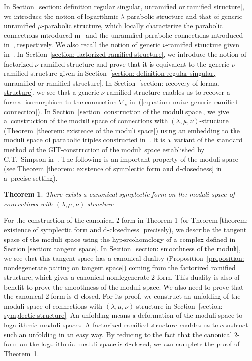 \documentclass[pdftex]{sigma}
\numberwithin{equation}{section}
\newtheorem{Theorem}{Theorem}[section]
\begin{document}
In Section~\ref{section: definition regular singular, unramified or ramified structure},
we introduce the notion of logarithmic $\lambda$-parabolic structure
and that of generic unramified $\mu$-parabolic structure, which locally
characterize the parabolic connections introduced in~\cite{Inaba-1}
and the unramified parabolic connections introduced in~\cite{Inaba-Saito}, respectively.
We also recall the notion of generic $\nu$-ramified structure given in~\cite{Inaba-2}.
In Section~\ref{section: factorized ramified structure},
we introduce the notion of factorized $\nu$-ramified structure and
prove that it is equivalent to the generic $\nu$-ramified structure given
in Section~\ref{section: definition regular singular, unramified or ramified structure}.
In Section~\ref{section: recovery of formal structure},
we see that a generic $\nu$-ramified structure enables us to
recover a formal isomorphism to the connection $\nabla_{\nu}$
in~(\ref{equation: naive generic ramified connection}).
In Section~\ref{section: construction of the moduli space},
we give a~construction of the moduli space of connections with $(\lambda,\mu,\nu)$-structure
(Theorem~\ref{theorem: existence of the moduli space})
using an embedding to the moduli space of parabolic triples constructed in~\cite{IIS-1}.
It is a~variant of the standard method of the GIT-construction of the moduli space
established by C.T.~Simpson in~\cite{Simpson-1,Simpson-2}.
The following is an important property of the moduli space
(see Theorem \ref{theorem: existence of symplectic form and d-closedness}
in a~precise setting).

\begin{Theorem} \label{theorem: 1}
There exists a canonical symplectic form on the moduli space of connections
with $(\lambda,\mu,\nu)$-structure.
\end{Theorem}


For the construction of the canonical $2$-form in Theorem \ref{theorem: 1}
(or Theorem \ref{theorem: existence of symplectic form and d-closedness} precisely),
we describe the tangent space of the moduli space
using the hypercohomology of a complex defined in Section \ref{section: tangent space}.
In Section~\ref{section: smoothness of the moduli},
we see that this tangent space has a canonical duality
(Proposition~\ref{proposition: nondegenerate pairing on tangent space})
coming from the factorized ramified structure,
which gives a canonical nondegenerate $2$-form.
This duality is also of benefit to prove the smoothness of the moduli space.
We also need to prove that the canonical $2$-form is ${\rm d}$-closed.
For its proof, we construct an unfolding of the moduli space of connections
with $(\lambda,\mu,\nu)$-structure in Section~\ref{section: symplectic structure}.
An unfolding means a deformation of the moduli space to logarithmic moduli spaces.
A factorized ramified structure enables us to construct such an unfolding
in an easy way.
By reducing to the fact that the canonical $2$-form on the logarithmic
moduli space is ${\rm d}$-closed, we can complete the proof of
Theorem~\ref{theorem: 1}.
\end{document}
